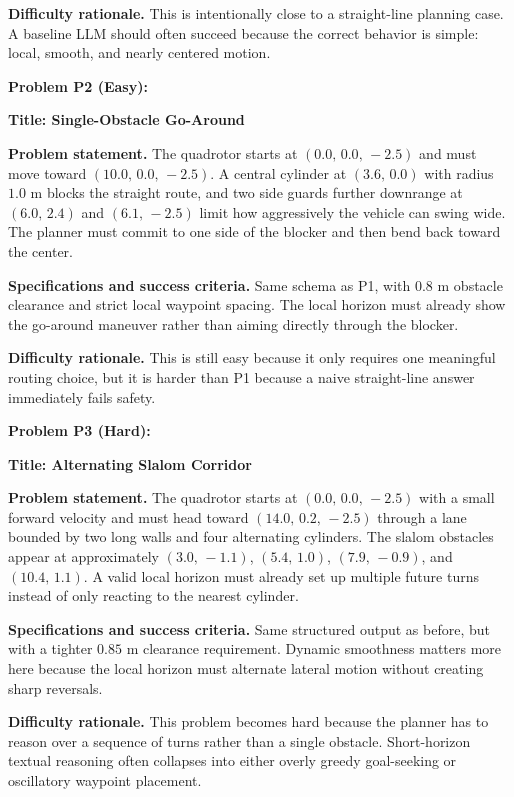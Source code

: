 \documentclass[12pt]{article}
\begin{document}
\noindent\textbf{Difficulty rationale.}
This is intentionally close to a straight-line planning case. A baseline LLM should often succeed
because the correct behavior is simple: local, smooth, and nearly centered motion.

\bigskip
\textbf{Problem P2 (Easy):}

\medskip
\noindent\textbf{Title: Single-Obstacle Go-Around}

\noindent\textbf{Problem statement.}
The quadrotor starts at $(0.0,\,0.0,\,-2.5)$ and must move toward
$(10.0,\,0.0,\,-2.5)$. A central cylinder at $(3.6,\,0.0)$ with radius $1.0$ m blocks the
straight route, and two side guards further downrange at $(6.0,\,2.4)$ and $(6.1,\,-2.5)$ limit
how aggressively the vehicle can swing wide. The planner must commit to one side of the blocker
and then bend back toward the center.

\noindent\textbf{Specifications and success criteria.}
Same schema as P1, with $0.8$ m obstacle clearance and strict local waypoint spacing. The local
horizon must already show the go-around maneuver rather than aiming directly through the blocker.

\noindent\textbf{Difficulty rationale.}
This is still easy because it only requires one meaningful routing choice, but it is harder than
P1 because a naive straight-line answer immediately fails safety.

\bigskip
\textbf{Problem P3 (Hard):}

\medskip
\noindent\textbf{Title: Alternating Slalom Corridor}

\noindent\textbf{Problem statement.}
The quadrotor starts at $(0.0,\,0.0,\,-2.5)$ with a small forward velocity and must head toward
$(14.0,\,0.2,\,-2.5)$ through a lane bounded by two long walls and four alternating cylinders.
The slalom obstacles appear at approximately $(3.0,\,-1.1)$, $(5.4,\,1.0)$, $(7.9,\,-0.9)$,
and $(10.4,\,1.1)$. A valid local horizon must already set up multiple future turns instead of
only reacting to the nearest cylinder.

\noindent\textbf{Specifications and success criteria.}
Same structured output as before, but with a tighter $0.85$ m clearance requirement. Dynamic
smoothness matters more here because the local horizon must alternate lateral motion without
creating sharp reversals.

\noindent\textbf{Difficulty rationale.}
This problem becomes hard because the planner has to reason over a sequence of turns rather than a
single obstacle. Short-horizon textual reasoning often collapses into either overly greedy
goal-seeking or oscillatory waypoint placement.
\end{document}
